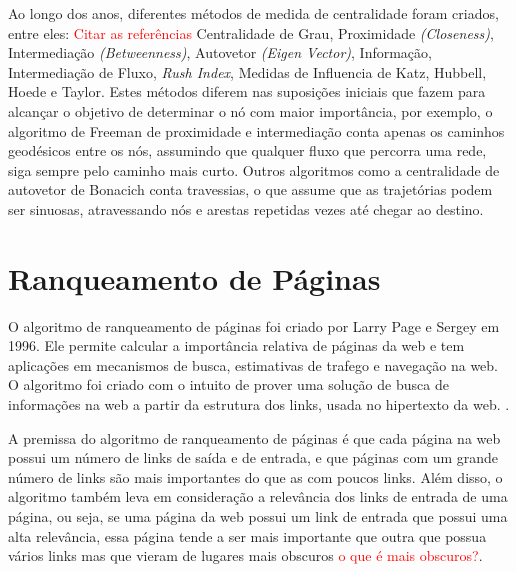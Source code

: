 
Ao longo dos anos, diferentes métodos de medida de centralidade foram criados, entre eles: \textcolor{red}{Citar as referências}
Centralidade de Grau, Proximidade \textit{(Closeness)}, Intermediação \textit{(Betweenness)}, Autovetor \textit{(Eigen Vector)}, Informação, Intermediação de Fluxo, \textit{Rush Index}, Medidas de Influencia de Katz, Hubbell, Hoede e Taylor. Estes métodos diferem nas suposições
iniciais que fazem para alcançar o objetivo de determinar o nó com maior importância, por exemplo,
o algoritmo de Freeman de proximidade e intermediação conta apenas os caminhos geodésicos entre 
os nós, assumindo que qualquer fluxo que percorra uma rede, siga sempre pelo caminho mais curto.
Outros algoritmos como a centralidade de autovetor de Bonacich conta travessias, o que assume
que as trajetórias podem ser sinuosas, atravessando nós e arestas repetidas vezes até chegar ao
destino\cite{centrality}.


\section{Ranqueamento de Páginas}
\label{ref:ran}
O algoritmo de ranqueamento de páginas foi criado por Larry Page e Sergey em 1996. Ele permite calcular a importância relativa de páginas da web e tem aplicações em mecanismos de busca, estimativas de trafego e navegação na web. O algoritmo foi criado com o intuito de prover uma solução de busca de informações na web a partir da estrutura dos links, usada no hipertexto da web. \cite{pageRank}.

A premissa do algoritmo de ranqueamento de páginas é que cada página na web
possui um número de links de saída e de entrada, e que páginas com um grande número de links são mais importantes do que as com poucos links. Além disso, o algoritmo também leva em consideração a relevância dos links de entrada de uma página, ou seja, se uma página da web possui um link de entrada que possui uma alta relevância, essa página tende a ser mais importante que outra que possua vários links mas que vieram de lugares mais obscuros \textcolor{red}{o que é mais obscuros?}.



